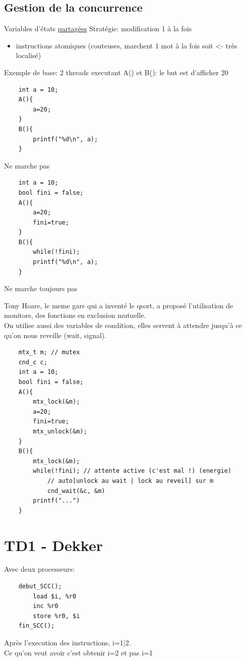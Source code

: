 \documentclass[11pt]{article}
\begin{document}
\subsection{Gestion de la concurrence}
Variables d'états \underline{partagées}
Stratégie: modification 1 à la fois
\begin{itemize}
	\item instructions atomiques (couteuses, marchent 1 mot à la fois soit <- très localisé)\\
\end{itemize}

Exemple de base: 2 threads executant A() et B(): le but est d'afficher 20
\begin{verbatim}
	int a = 10;
	A(){
		a=20;
	}
	B(){
		printf("%d\n", a);
	}
\end{verbatim}
Ne marche pas

\begin{verbatim}
	int a = 10;
	bool fini = false;
	A(){
		a=20;
		fini=true;
	}
	B(){
		while(!fini);
		printf("%d\n", a);
	}
\end{verbatim}
Ne marche toujours pas

\pagebreak


Tony Hoare, le meme gars qui a inventé le qsort, a proposé l'utilisation de monitors, des fonctions en exclusion mutuelle. \\
On utilise aussi des variables de condition, elles servent à attendre jusqu'à ce qu'on nous reveille (wait, signal).

\begin{verbatim}
	mtx_t m; // mutex
	cnd_c c;
	int a = 10;
	bool fini = false;
	A(){
		mtx_lock(&m);
		a=20;
		fini=true;
		mtx_unlock(&m);
	}
	B(){
		mtx_lock(&m);
		while(!fini); // attente active (c'est mal !) (energie)
			// auto[unlock au wait | lock au reveil] sur m
			cnd_wait(&c, &m) 
		printf("...")
	}
\end{verbatim}

\pagebreak

\section{TD1 - Dekker}
Avec deux processeurs:
\begin{verbatim}
	debut_SCC();
		load $i, %r0
		inc %r0
		store %r0, $i
	fin_SCC();
\end{verbatim}
Après l'execution des instructions, i=1|2.\\
Ce qu'on veut avoir c'est obtenir i=2 et pas i=1
\end{document}
